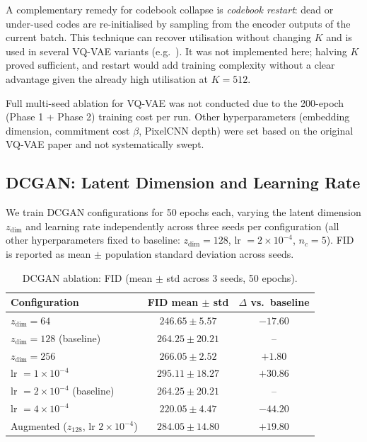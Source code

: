 \documentclass[12pt,a4paper]{article}
\begin{document}
A complementary remedy for codebook collapse is \emph{codebook restart}: dead
or under-used codes are re-initialised by sampling from the encoder outputs of
the current batch.  This technique can recover utilisation without changing $K$
and is used in several VQ-VAE variants (e.g.\ \cite{vqvae2}).  It was not
implemented here; halving $K$ proved sufficient, and restart would add training
complexity without a clear advantage given the already high utilisation at
$K=512$.

Full multi-seed ablation for VQ-VAE was not conducted due to the 200-epoch
(Phase 1 + Phase 2) training cost per run.  Other hyperparameters (embedding
dimension, commitment cost $\beta$, PixelCNN depth) were set based on the
original VQ-VAE paper \cite{vqvae} and not systematically swept.

\subsection{DCGAN: Latent Dimension and Learning Rate}
\label{sec:dcgan_ablation}

We train DCGAN configurations for 50 epochs each, varying the latent
dimension $z_{\text{dim}}$ and learning rate independently across three seeds
per configuration (all other hyperparameters fixed to baseline:
$z_{\text{dim}}=128$, lr $=2\times10^{-4}$, $n_c=5$).  FID is reported as
mean $\pm$ population standard deviation across seeds.

\begin{table}[H]
  \centering
  \caption{DCGAN ablation: FID (mean $\pm$ std across 3 seeds, 50 epochs).}
  \label{tab:dcgan_ablation}
  \begin{tabular}{lcc}
    \toprule
    Configuration & FID mean $\pm$ std & $\Delta$ vs.\ baseline \\
    \midrule
    $z_{\text{dim}} = 64$              & $246.65 \pm 5.57$  & $-17.60$ \\
    $z_{\text{dim}} = 128$ (baseline)  & $264.25 \pm 20.21$ & -- \\
    $z_{\text{dim}} = 256$             & $266.05 \pm 2.52$  & $+1.80$ \\
    \midrule
    lr $= 1 \times 10^{-4}$            & $295.11 \pm 18.27$ & $+30.86$ \\
    lr $= 2 \times 10^{-4}$ (baseline) & $264.25 \pm 20.21$ & -- \\
    lr $= 4 \times 10^{-4}$            & $220.05 \pm 4.47$  & $-44.20$ \\
    \midrule
    Augmented ($z_{128}$, lr $2\times10^{-4}$) & $284.05 \pm 14.80$ & $+19.80$ \\
    \bottomrule
  \end{tabular}
\end{table}
\end{document}

